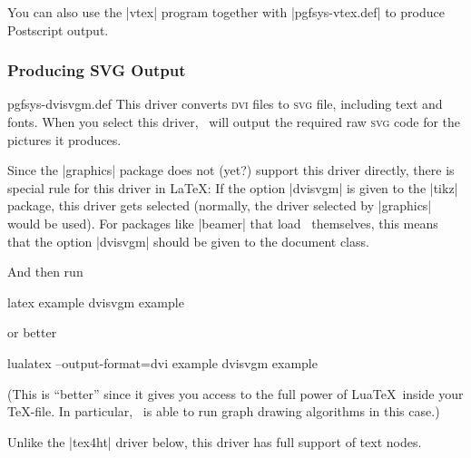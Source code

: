 You can also use the |vtex| program together with |pgfsys-vtex.def| to produce
Postscript output.


\subsubsection{Producing SVG Output}

\begin{filedescription}{pgfsys-dvisvgm.def}
    This driver converts \textsc{dvi} files to \textsc{svg} file, including
    text and fonts. When you select this driver, \pgfname\ will output the
    required raw \textsc{svg} code for the pictures it produces.

    Since the |graphics| package does not (yet?) support this driver directly,
    there is special rule for this driver in \LaTeX: If the option |dvisvgm| is
    given to the |tikz| package, this driver gets selected (normally, the
    driver selected by |graphics| would be used). For packages like |beamer|
    that load \pgfname\ themselves, this means that the option |dvisvgm| should
    be given to the document class.

    And then run
\begin{codeexample}
latex example
dvisvgm example
\end{codeexample}
    or better
\begin{codeexample}
lualatex --output-format=dvi example
dvisvgm example
\end{codeexample}
    (This is ``better'' since it gives you access to the full power of Lua\TeX\
    inside your \TeX-file. In particular, \tikzname\ is able to run graph
    drawing algorithms in this case.)

    Unlike the |tex4ht| driver below, this driver has full support of text
    nodes.
\end{filedescription}

